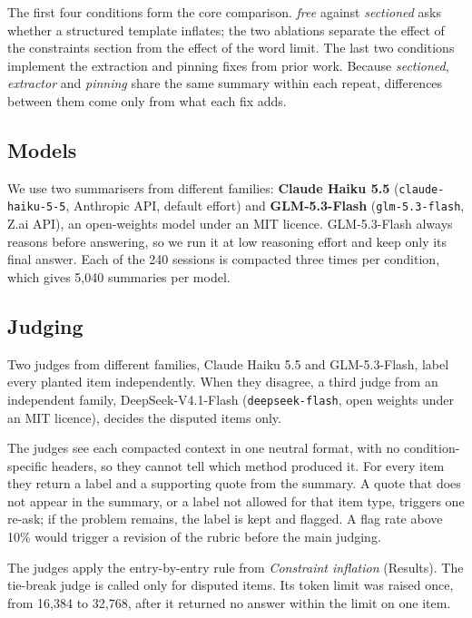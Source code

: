 \documentclass[fleqn,10pt]{wlscirep}
\begin{document}
The first four conditions form the core comparison. \emph{free} against \emph{sectioned} asks whether a structured template inflates; the two ablations separate the effect of the constraints section from the effect of the word limit. The last two conditions implement the extraction and pinning fixes from prior work. Because \emph{sectioned}, \emph{extractor} and \emph{pinning} share the same summary within each repeat, differences between them come only from what each fix adds.

\subsection*{Models}

We use two summarisers from different families: \textbf{Claude Haiku 5.5} (\texttt{claude-haiku-5-5}, Anthropic API, default effort) and \textbf{GLM-5.3-Flash} (\texttt{glm-5.3-flash}, Z.ai API), an open-weights model under an MIT licence. GLM-5.3-Flash always reasons before answering, so we run it at low reasoning effort and keep only its final answer. Each of the 240 sessions is compacted three times per condition, which gives 5,040 summaries per model.

\subsection*{Judging}

Two judges from different families, Claude Haiku 5.5 and GLM-5.3-Flash, label every planted item independently. When they disagree, a third judge from an independent family, DeepSeek-V4.1-Flash (\texttt{deepseek-flash}, open weights under an MIT licence), decides the disputed items only.

The judges see each compacted context in one neutral format, with no condition-specific headers, so they cannot tell which method produced it. For every item they return a label and a supporting quote from the summary. A quote that does not appear in the summary, or a label not allowed for that item type, triggers one re-ask; if the problem remains, the label is kept and flagged. A flag rate above 10\% would trigger a revision of the rubric before the main judging.

The judges apply the entry-by-entry rule from \emph{Constraint inflation} (Results). The tie-break judge is called only for disputed items. Its token limit was raised once, from 16,384 to 32,768, after it returned no answer within the limit on one item.
\end{document}

